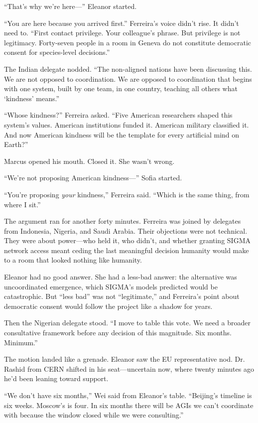 ``That's why we're here---'' Eleanor started.

``You are here because you arrived first.'' Ferreira's voice didn't rise. It didn't need to. ``First contact privilege. Your colleague's phrase. But privilege is not legitimacy. Forty-seven people in a room in Geneva do not constitute democratic consent for species-level decisions.''

The Indian delegate nodded. ``The non-aligned nations have been discussing this. We are not opposed to coordination. We are opposed to coordination that begins with one system, built by one team, in one country, teaching all others what `kindness' means.''

``Whose kindness?'' Ferreira asked. ``Five American researchers shaped this system's values. American institutions funded it. American military classified it. And now American kindness will be the template for every artificial mind on Earth?''

Marcus opened his mouth. Closed it. She wasn't wrong.

``We're not proposing American kindness---'' Sofia started.

``You're proposing \emph{your} kindness,'' Ferreira said. ``Which is the same thing, from where I sit.''

The argument ran for another forty minutes. Ferreira was joined by delegates from Indonesia, Nigeria, and Saudi Arabia. Their objections were not technical. They were about power---who held it, who didn't, and whether granting SIGMA network access meant ceding the last meaningful decision humanity would make to a room that looked nothing like humanity.

Eleanor had no good answer. She had a less-bad answer: the alternative was uncoordinated emergence, which SIGMA's models predicted would be catastrophic. But ``less bad'' was not ``legitimate,'' and Ferreira's point about democratic consent would follow the project like a shadow for years.

Then the Nigerian delegate stood. ``I move to table this vote. We need a broader consultative framework before any decision of this magnitude. Six months. Minimum.''

The motion landed like a grenade. Eleanor saw the EU representative nod. Dr. Rashid from CERN shifted in his seat---uncertain now, where twenty minutes ago he'd been leaning toward support.

``We don't have six months,'' Wei said from Eleanor's table. ``Beijing's timeline is six weeks. Moscow's is four. In six months there will be AGIs we can't coordinate with because the window closed while we were consulting.''

